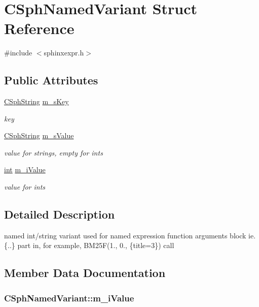 \hypertarget{structCSphNamedVariant}{\section{C\-Sph\-Named\-Variant Struct Reference}
\label{structCSphNamedVariant}
}


{\ttfamily \#include $<$sphinxexpr.\-h$>$}

\subsection*{Public Attributes}
\begin{DoxyCompactItemize}
\item 
\hyperlink{structCSphString}{C\-Sph\-String} \hyperlink{structCSphNamedVariant_a6a23f15d2cfe18697b094669273ee3db}{m\-\_\-s\-Key}
\begin{DoxyCompactList}\small\item\em key \end{DoxyCompactList}\item 
\hyperlink{structCSphString}{C\-Sph\-String} \hyperlink{structCSphNamedVariant_a44f68fd001613383ea1775dfcdb8f4c5}{m\-\_\-s\-Value}
\begin{DoxyCompactList}\small\item\em value for strings, empty for ints \end{DoxyCompactList}\item 
\hyperlink{sphinxexpr_8cpp_a4a26e8f9cb8b736e0c4cbf4d16de985e}{int} \hyperlink{structCSphNamedVariant_a359db2d8a71731f4f497a82be8b1d436}{m\-\_\-i\-Value}
\begin{DoxyCompactList}\small\item\em value for ints \end{DoxyCompactList}\end{DoxyCompactItemize}


\subsection{Detailed Description}
named int/string variant used for named expression function arguments block ie. \{..\} part in, for example, B\-M25\-F(1., 0., \{title=3\}) call 

\subsection{Member Data Documentation}
\hypertarget{structCSphNamedVariant_a359db2d8a71731f4f497a82be8b1d436}{
\subsubsection[{m\-\_\-i\-Value}]{ C\-Sph\-Named\-Variant\-::m\-\_\-i\-Value}}\label{structCSphNamedVariant_a359db2d8a71731f4f497a82be8b1d436}


